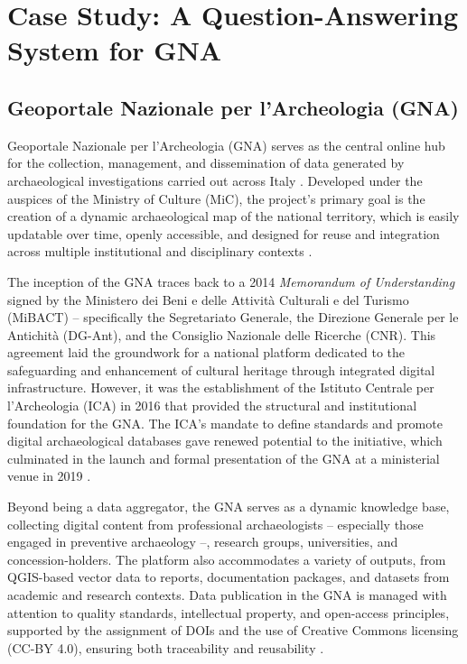 \chapter{Case Study: A Question-Answering System for GNA}
\label{chap:casestudy}
\sloppy
\begin{spacing}{1.5} 

\section{Geoportale Nazionale per l’Archeologia (GNA)}
Geoportale Nazionale per l'Archeologia (GNA) \citep{mic_mic_2019} serves as the central online hub for the collection, management, and dissemination of data generated by archaeological investigations carried out across Italy \citep{acconcia_pubblicazione_2023}. Developed under the auspices of the Ministry of Culture (MiC), the project's primary goal is the creation of a dynamic archaeological map of the national territory, which is easily updatable over time, openly accessible, and designed for reuse and integration across multiple institutional and disciplinary contexts \citep{falcone_dematerializzazione_2023}.

The inception of the GNA traces back to a 2014 \textit{Memorandum of Understanding} signed by the Ministero dei Beni e delle Attività Culturali e del Turismo (MiBACT) -- specifically the Segretariato Generale, the Direzione Generale per le Antichità (DG-Ant), and the Consiglio Nazionale delle Ricerche (CNR). This agreement laid the groundwork for a national platform dedicated to the safeguarding and enhancement of cultural heritage through integrated digital infrastructure. However, it was the establishment of the Istituto Centrale per l’Archeologia (ICA) in 2016 that provided the structural and institutional foundation for the GNA. The ICA’s mandate to define standards and promote digital archaeological databases gave renewed potential to the initiative, which culminated in the launch and formal presentation of the GNA at a ministerial venue in 2019 \citep{calandra_il_2023}.

Beyond being a data aggregator, the GNA serves as a dynamic knowledge base, collecting digital content from professional archaeologists -- especially those engaged in preventive archaeology --, research groups, universities, and concession-holders. The platform also accommodates a variety of outputs, from QGIS-based vector data to reports, documentation packages, and datasets from academic and research contexts. Data publication in the GNA is managed with attention to quality standards, intellectual property, and open-access principles, supported by the assignment of DOIs and the use of Creative Commons licensing (CC-BY 4.0), ensuring both traceability and reusability \citep{acconcia_pubblicazione_2023,falcone_dematerializzazione_2023,boi_il_2023}.


\end{spacing}
